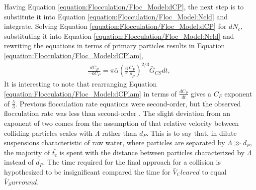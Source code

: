 \documentclass[letterpaper,10pt,english]{sphinxmanual}
\begin{document}
Having Equation \eqref{equation:Flocculation/Floc_Model:dCP}, the next step is to substitute it into Equation \eqref{equation:Flocculation/Floc_Model:Ncld} and integrate. Solving Equation \eqref{equation:Flocculation/Floc_Model:dCP} for \(dN_{c}\), substituting it into Equation \eqref{equation:Flocculation/Floc_Model:Ncld} and rewriting the equations in terms of primary particles results in Equation \eqref{equation:Flocculation/Floc_Model:dCPlam},
\begin{equation}\label{equation:Flocculation/Floc_Model:dCPlam}
\begin{split}      \frac{dC_{P}}{-kC_{P}}=\pi\bar{\alpha}\left(\frac{6}{\pi}\frac{C_{P}}{\rho_P}\right)^{2/3}\bar G_{CS}dt,\end{split}
\end{equation}
It is interesting to note that rearranging Equation \eqref{equation:Flocculation/Floc_Model:dCPlam} in terms of \(\frac{dC_P}{dt}\) gives a \(C_P\) exponent of \(\frac{5}{3}\). Previous flocculation rate equations were second-order, but the observed flocculation rate was less than second-order \label{\detokenize{Flocculation/Floc_Model:id4}}{\hyperref[\detokenize{Flocculation/Floc_Model:floc-model-benjamin-water-2013}]{\sphinxcrossref{{[}BL13{]}}}}. The slight deviation from an exponent of two comes from the assumption of \label{\detokenize{Flocculation/Floc_Model:id5}}{\hyperref[\detokenize{Flocculation/Floc_Model:floc-model-pennock-theoretical-2016}]{\sphinxcrossref{{[}PCWSL16{]}}}} that relative velocity between colliding particles scales with \(\Lambda\) rather than \(d_P\). This is to say that, in dilute suspensions characteristic of raw water, where particles are separated by \(\bar \Lambda\gg \bar{d}_P\), the majority of \(\bar{t_c}\) is spent with the distance between particles characterized by \(\bar \Lambda\) instead of \(\bar{d}_P\). The time required for the final approach for a collision is hypothesized to be insignificant compared the time for \(\bar{V}_Cleared\) to equal \(\bar{V}_Surround\).
\end{document}
